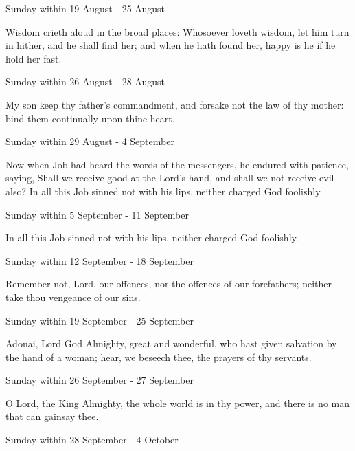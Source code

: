 \begin{multicols}{2}
\begin{inhead}
Sunday within 19 August - 25 August
\end{inhead}\par\noindent
Wisdom crieth {\dag} aloud in the broad places: Whosoever loveth wisdom, let him turn in hither, and he shall find her; and when he hath found her, happy is he if he hold her fast.
\begin{inhead}
Sunday within 26 August - 28 August
\end{inhead}\par\noindent
My son {\dag} keep thy father's commandment, and forsake not the law of thy mother: bind them continually upon thine heart.
\begin{inhead}
Sunday within 29 August - 4 September
\end{inhead}\par\noindent
Now when Job had heard {\dag} the words of the messengers, he endured with patience, saying, Shall we receive good at the Lord's hand, and shall we not receive evil also? In all this Job sinned not with his lips, neither charged God foolishly.
\begin{inhead}
Sunday within 5 September - 11 September
\end{inhead}\par\noindent
In all this {\dag} Job sinned not with his lips, neither charged God foolishly.
\begin{inhead}
Sunday within 12 September - 18 September
\end{inhead}\par\noindent
Remember not, {\dag} Lord, our offences, nor the offences of our forefathers; neither take thou vengeance of our sins.
\begin{inhead}
Sunday within 19 September - 25 September
\end{inhead}\par\noindent
Adonai, {\dag} Lord God Almighty, great and wonderful, who hast given salvation by the hand of a woman; hear, we beseech thee, the prayers of thy servants.
\begin{inhead}
Sunday within 26 September - 27 September
\end{inhead}\par\noindent
O Lord, {\dag} the King Almighty, the whole world is in thy power, and there is no man that can gainsay thee.
\begin{inhead}
Sunday within 28 September - 4 October
\end{inhead}\par\noindent

\end{multicols}
